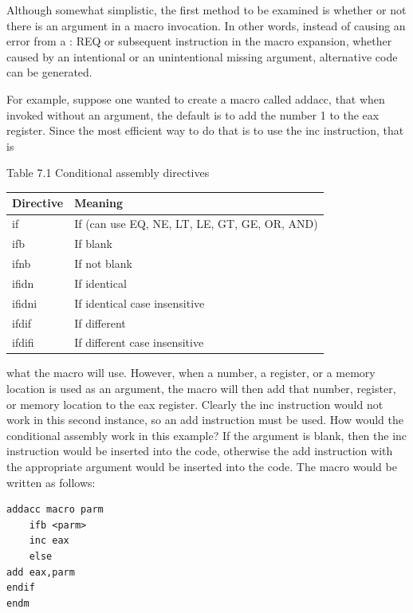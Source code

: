 \documentclass[10pt]{article}
\begin{document}
Although somewhat simplistic, the first method to be examined is whether or not there is an argument in a macro invocation. In other words, instead of causing an error from a : REQ or subsequent instruction in the macro expansion, whether caused by an intentional or an unintentional missing argument, alternative code can be generated.

For example, suppose one wanted to create a macro called addacc, that when invoked without an argument, the default is to add the number 1 to the eax register. Since the most efficient way to do that is to use the inc instruction, that is

Table 7.1 Conditional assembly directives

\begin{center}
\begin{tabular}{ll}
\hline
Directive & Meaning \\
\hline
if & If (can use EQ, NE, LT, LE, GT, GE, OR, AND) \\
ifb & If blank \\
ifnb & If not blank \\
ifidn & If identical \\
ifidni & If identical case insensitive \\
ifdif & If different \\
ifdifi & If different case insensitive \\
\hline
\end{tabular}
\end{center}

what the macro will use. However, when a number, a register, or a memory location is used as an argument, the macro will then add that number, register, or memory location to the eax register. Clearly the inc instruction would not work in this second instance, so an add instruction must be used. How would the conditional assembly work in this example? If the argument is blank, then the inc instruction would be inserted into the code, otherwise the add instruction with the appropriate argument would be inserted into the code. The macro would be written as follows:

\begin{verbatim}
addacc macro parm
    ifb <parm>
    inc eax
    else
add eax,parm
endif
endm
\end{verbatim}
\end{document}
